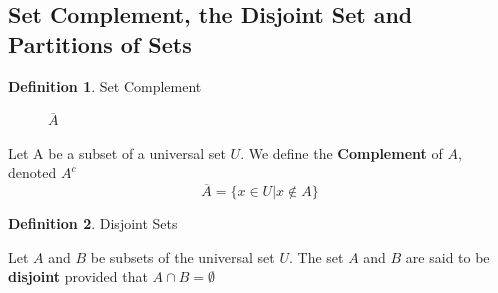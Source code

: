 \documentclass{book}
\theoremstyle{definition}
\newtheorem{definition}{Definition}[section]
\theoremstyle{remark}
\begin{document}
\newpage
\subsection{Set Complement, the Disjoint Set and Partitions of Sets}

\begin{definition}
Set Complement \\


\begin{figure}[H]
    \centering
        \def \setA{ (0,0) circle (1cm) }

        \def \myrectangle{ (-1.5, -1.5) rectangle (1.5, 1.5) }
            \begin{center}
            \end{center}
    \caption{$\overline{A}$}
    \label{fig:Acomp}
\end{figure}


\begin{tcolorbox}
    Let A be a subset of a universal set $U$. We define the \textbf{Complement} of $A$, denoted $A^c$
    \begin{equation*}
            \overline{A} = \{x \in U | x \notin A \}
        \end{equation*}
\end{tcolorbox}
\end{definition}


\begin{definition}
Disjoint Sets

\begin{tcolorbox}
    Let $A$ and $B$ be subsets of the universal set $U$. The set $A$ and $B$ are said to be \textbf{disjoint} provided that $A \cap B = \emptyset$
\end{tcolorbox}
\end{definition}
\end{document}
